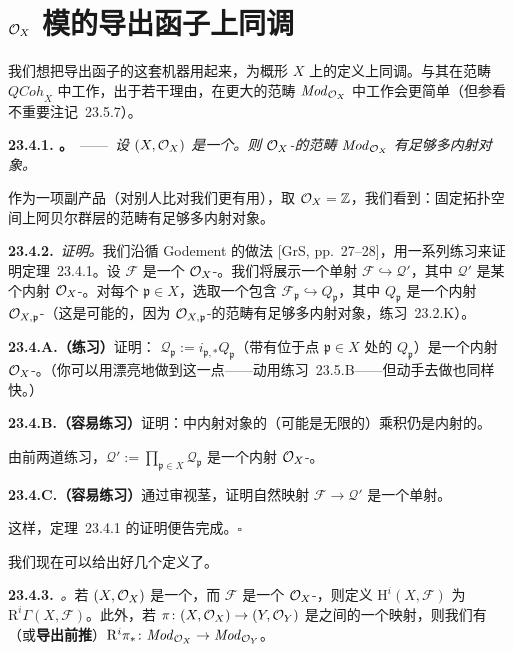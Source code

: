 
\section{$\mathcal{O}_X$ 模的导出函子上同调}

我们想把导出函子的这套机器用起来，为概形 $X$ 上的\trQCSheaf{}定义上同调。与其在范畴 $\mathit{QCoh}_X$ 中工作，出于若干理由，在更大的范畴 $\mathit{Mod}_{\mathcal{O}_X}$ 中工作会更简单（但参看\mbox{不重要注记~23.5.7}）。

\textbf{23.4.1. \trhTheorem。}\ ——\ \emph{设 $(X,\mathcal{O}_X)$ 是一个\trRingedSpace。则 $\mathcal{O}_X$-\trModule{}的范畴 $\mathit{Mod}_{\mathcal{O}_X}$ 有足够多内射对象。}

作为一项副产品（对别人比对我们更有用），取 $\mathcal{O}_X=\mathbb{Z}$，我们看到：固定拓扑空间上阿贝尔群层的范畴有足够多内射对象。

\textbf{23.4.2.}\ \emph{证明。}\quad 我们沿循 Godement 的做法 [GrS, pp.~27--28]，用一系列练习来证明\mbox{定理~23.4.1}。设 $\mathscr{F}$ 是一个 $\mathcal{O}_X$-\trModule。我们将展示一个单射 $\mathscr{F}\hookrightarrow\mathscr{Q}'$，其中 $\mathscr{Q}'$ 是某个内射 $\mathcal{O}_X$-\trModule。对每个 $\mathfrak{p}\in X$，选取一个包含 $\mathscr{F}_\mathfrak{p}\hookrightarrow Q_\mathfrak{p}$，其中 $Q_\mathfrak{p}$ 是一个内射 $\mathcal{O}_{X,\mathfrak{p}}$-\trModule（这是可能的，因为 $\mathcal{O}_{X,\mathfrak{p}}$-\trModule{}的范畴有足够多内射对象，\mbox{练习~23.2.K}）。

\textbf{23.4.A.（练习）}\quad 证明：\trSkyscraperSheaf{} $\mathscr{Q}_\mathfrak{p}:=i_{\mathfrak{p},\ast}Q_\mathfrak{p}$（带有位于点 $\mathfrak{p}\in X$ 处的\trModule{} $Q_\mathfrak{p}$）是一个内射 $\mathcal{O}_X$-\trModule。（你可以用\trAbstractNonsense{}漂亮地做到这一点——动用\mbox{练习~23.5.B}——但动手去做也同样快。）

\textbf{23.4.B.（容易练习）}\quad 证明：\trAbelianCategory{}中内射对象的（可能是无限的）乘积仍是内射的。

由前两道练习，$\mathscr{Q}':=\prod_{\mathfrak{p}\in X}\mathscr{Q}_\mathfrak{p}$ 是一个内射 $\mathcal{O}_X$-\trModule。

\textbf{23.4.C.（容易练习）}\quad 通过审视茎，证明自然映射 $\mathscr{F}\to\mathscr{Q}'$ 是一个单射。

这样，\mbox{定理~23.4.1} 的证明便告完成。\hfill$\square$

我们现在可以给出好几个定义了。

\textbf{23.4.3.}\ \emph{\trhDefinition。}\quad 若 $(X,\mathcal{O}_X)$ 是一个\trRingedSpace，而 $\mathscr{F}$ 是一个 $\mathcal{O}_X$-\trModule，则定义 $\mathrm{H}^i(X,\mathscr{F})$ 为 $\mathrm{R}^i\Gamma(X,\mathscr{F})$。此外，若 $\pi\colon(X,\mathcal{O}_X)\to(Y,\mathcal{O}_Y)$ 是\trRingedSpace{}之间的一个映射，则我们有\textbf{\trHigherPushforward}（或\textbf{导出前推}）$\mathrm{R}^i\pi_\ast\colon\mathit{Mod}_{\mathcal{O}_X}\to\mathit{Mod}_{\mathcal{O}_Y}$。

